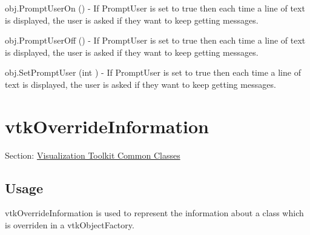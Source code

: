 \begin{DoxyItemize}
\item {\ttfamily obj.\-Prompt\-User\-On ()} -\/ If Prompt\-User is set to true then each time a line of text is displayed, the user is asked if they want to keep getting messages.  
\item {\ttfamily obj.\-Prompt\-User\-Off ()} -\/ If Prompt\-User is set to true then each time a line of text is displayed, the user is asked if they want to keep getting messages.  
\item {\ttfamily obj.\-Set\-Prompt\-User (int )} -\/ If Prompt\-User is set to true then each time a line of text is displayed, the user is asked if they want to keep getting messages.  
\end{DoxyItemize}\hypertarget{vtkcommon_vtkoverrideinformation}{}\section{vtk\-Override\-Information}\label{vtkcommon_vtkoverrideinformation}
Section\-: \hyperlink{sec_vtkcommon}{Visualization Toolkit Common Classes} \hypertarget{vtkwidgets_vtkxyplotwidget_Usage}{}\subsection{Usage}\label{vtkwidgets_vtkxyplotwidget_Usage}
vtk\-Override\-Information is used to represent the information about a class which is overriden in a vtk\-Object\-Factory.

